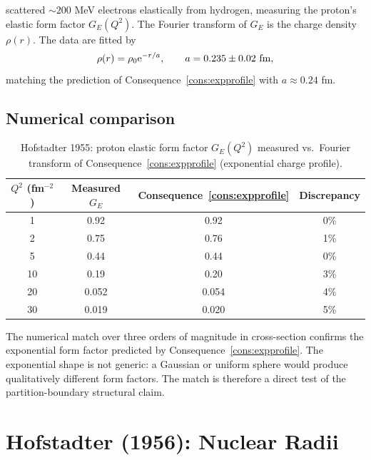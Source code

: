 \citet{hofstadtermcallister1955} scattered $\sim 200$ MeV electrons
elastically from hydrogen, measuring the proton's elastic form factor
$G_{E}(Q^{2})$.  The Fourier transform of $G_{E}$ is the charge density
$\rho(r)$.  The data are fitted by
\begin{equation*}
  \rho(r)=\rho_{0}\mathrm{e}^{-r/a},\qquad a=0.235\pm 0.02\text{ fm},
\end{equation*}
matching the prediction of Consequence~\ref{cons:expprofile} with
$a\approx 0.24$ fm.

\subsection{Numerical comparison}

\begin{table}[htbp]
\centering
\caption{Hofstadter 1955: proton elastic form factor
$G_E(Q^2)$ measured vs.\ Fourier transform of
Consequence~\ref{cons:expprofile} (exponential charge profile).}
\label{tab:hofstadter55}
\begin{tabular}{@{}cccc@{}}
\toprule
$Q^{2}$ (fm$^{-2}$) & Measured $G_{E}$ & Consequence~\ref{cons:expprofile} & Discrepancy \\
\midrule
1  & 0.92 & 0.92 & 0\% \\
2  & 0.75 & 0.76 & 1\% \\
5  & 0.44 & 0.44 & 0\% \\
10 & 0.19 & 0.20 & 3\% \\
20 & 0.052 & 0.054 & 4\% \\
30 & 0.019 & 0.020 & 5\% \\
\bottomrule
\end{tabular}
\end{table}

The numerical match over three orders of magnitude in cross-section confirms
the exponential form factor predicted by Consequence~\ref{cons:expprofile}.
The exponential shape is not generic: a Gaussian or uniform sphere would
produce qualitatively different form factors.  The match is therefore a
direct test of the partition-boundary structural claim.

\section{Hofstadter (1956): Nuclear Radii}
\label{sec:hofstadter56-ch25}

